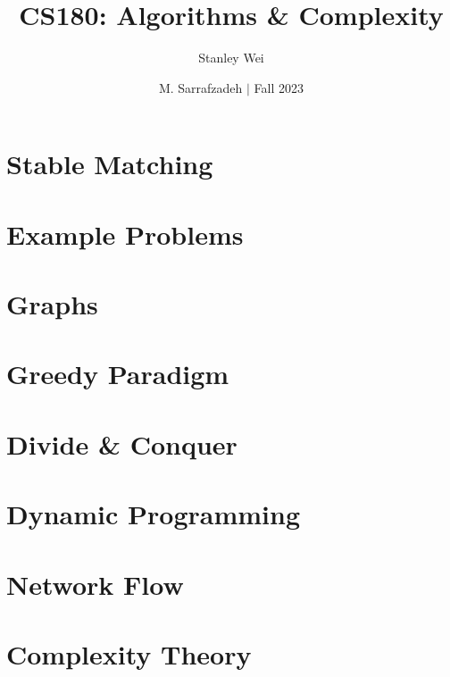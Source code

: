 \documentclass[12pt]{extarticle}
\title{CS180: Algorithms \& Complexity}
\author{Stanley Wei}
\date{M. Sarrafzadeh $\vert$ Fall 2023}
\theoremstyle{definition}
\theoremstyle{remark}
\begin{document}
\maketitle
\tableofcontents

\newpage
\section{Stable Matching}


\newpage
\section{Example Problems}


\newpage
\section{Graphs}


\newpage
\section{Greedy Paradigm}


\newpage
\section{Divide \& Conquer}


\newpage
\section{Dynamic Programming}


\newpage
\section{Network Flow}


\newpage
\section{Complexity Theory}

\end{document}
